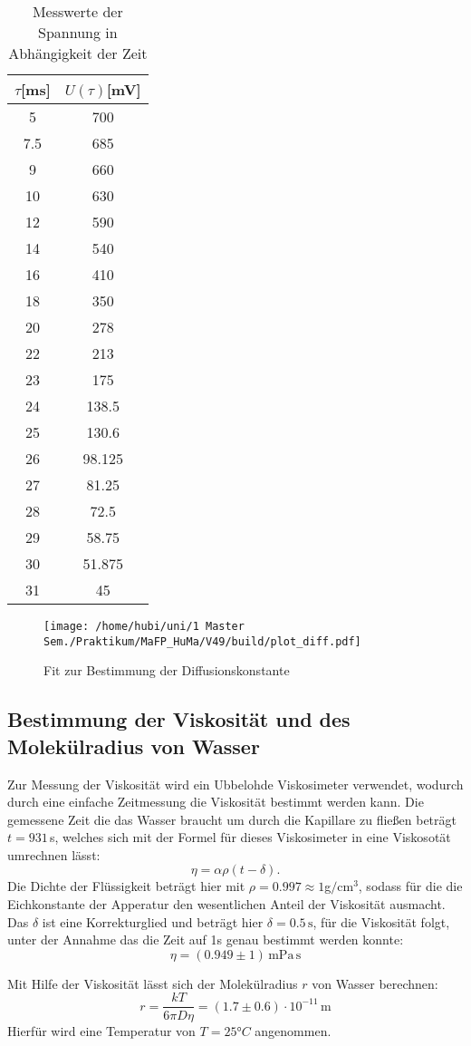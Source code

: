 \begin{table}
  \centering
  \caption{Messwerte der Spannung in Abhängigkeit der Zeit}
  \label{tabmess1}
  \begin{tabular}{c|c}
    \toprule
    $\tau$[ms] & $U(\tau)$[mV]\\
    \midrule
5&   700\\
7.5& 685\\
9  & 660\\
10 & 630\\
12 & 590\\
14 & 540\\
16 & 410\\
18 & 350\\
20 & 278\\
22 & 213\\
23 & 175\\
24 & 138.5\\
25 & 130.6\\
26 & 98.125\\
27 & 81.25\\
28 & 72.5\\
29 & 58.75\\
30 & 51.875\\
31 & 45     \\

\bottomrule
\end{tabular}
\end{table}

\begin{figure}[h]
\centering
\texttt{[image: /home/hubi/uni/1 Master Sem./Praktikum/MaFP\_HuMa/V49/build/plot\_diff.pdf]}
\caption{Fit zur Bestimmung der Diffusionskonstante}
\label{fitd}
\end{figure}

\subsection{Bestimmung der Viskosität und des Molekülradius von Wasser}
Zur Messung der Viskosität wird ein Ubbelohde Viskosimeter verwendet,
wodurch durch eine einfache Zeitmessung die Viskosität bestimmt werden kann.
Die gemessene Zeit die das Wasser braucht um durch die
Kapillare zu fließen beträgt $t=931\,$s, welches sich mit der Formel für
dieses Viskosimeter in eine Viskosotät umrechnen lässt:
$$ \eta=\alpha \rho (t- \delta).$$
Die Dichte der Flüssigkeit beträgt hier mit $\rho=0.997\approx 1$g$/$c$\text{m}^3$,
sodass für die die Eichkonstante der Apperatur den wesentlichen Anteil
der Viskosität ausmacht. Das $\delta$ ist eine Korrekturglied und beträgt hier
$\delta=0.5\, \text{s}$, für die Viskosität folgt, unter der Annahme das die Zeit auf
1s genau bestimmt werden konnte:
$$\eta=(0.949 \pm1)\,\text{mPa}\,\text{s} $$

Mit Hilfe der Viskosität lässt sich der Molekülradius $r$ von  Wasser berechnen:
$$r=\frac{kT}{6 \pi D \eta}=(1.7\pm 0.6)\cdot 10^{-11}\, \text{m}$$
Hierfür wird eine Temperatur von $T=25°C$ angenommen.

